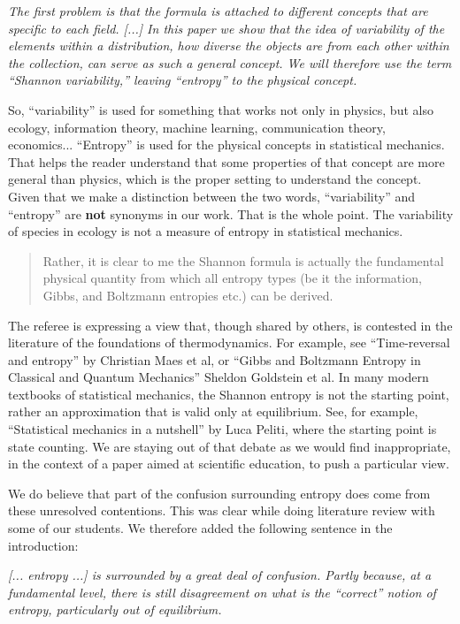 \documentclass[11pt]{article}
\begin{document}
\emph{The first problem is that the formula is attached to different concepts that are specific to each field. [...] In this paper we show that the idea of variability of the elements within a distribution, how diverse the objects are from each other within the collection, can serve as such a general concept. We will therefore use the term \emph{``Shannon variability,''} leaving ``entropy'' to the physical concept.}

So, ``variability'' is used for something that works not only in physics, but also ecology, information theory, machine learning, communication theory, economics... ``Entropy'' is used for the physical concepts in statistical mechanics. That helps the reader understand that some properties of that concept are more general than physics, which is the proper setting to understand the concept. Given that we make a distinction between the two words, ``variability'' and ``entropy'' are \textbf{not} synonyms in our work. That is the whole point. The variability of species in ecology is not a measure of entropy in statistical mechanics.

\begin{quote}
Rather, it is clear to me the Shannon formula is actually the fundamental physical quantity from which all entropy types (be it the information, Gibbs, and Boltzmann entropies etc.) can be derived.
\end{quote}
The referee is expressing a view that, though shared by others, is contested in the literature of the foundations of thermodynamics. For example, see ``Time-reversal and entropy'' by Christian Maes et al, or ``Gibbs and Boltzmann Entropy in Classical and Quantum Mechanics''
Sheldon Goldstein et al. In many modern textbooks of statistical mechanics, the Shannon entropy is not the starting point, rather an approximation that is valid only at equilibrium. See, for example, ``Statistical mechanics in a nutshell'' by Luca Peliti, where the starting point is state counting. We are staying out of that debate as we would find inappropriate, in the context of a paper aimed at scientific education, to push a particular view.

We do believe that part of the confusion surrounding entropy does come from these unresolved contentions. This was clear while doing literature review with some of our students. We therefore added the following sentence in the introduction:

\emph{[... entropy ...] is surrounded by a great deal of confusion. Partly because, at a fundamental level, there is still disagreement on what is the ``correct'' notion of entropy, particularly out of equilibrium.}
\end{document}
